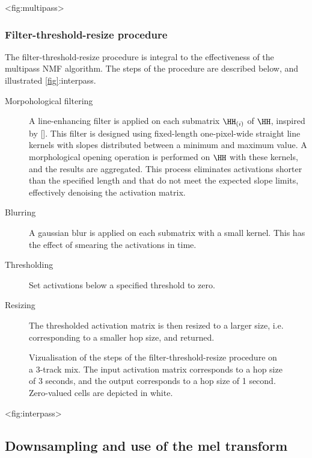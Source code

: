 \textless fig:multipass\textgreater{}

\subsubsection{Filter-threshold-resize procedure}

The filter-threshold-resize procedure is integral to the effectiveness
of the multipass NMF algorithm. The steps of the procedure are described
below, and illustrated \hyperref[fig]{{[}fig{]}}:interpass.

\begin{description}
\item[Morpohological filtering]
A line-enhancing filter is applied on each submatrix
\(\HH_{(i)}\) of \(\HH\), inspired by {[}{]}. This
filter is designed using fixed-length one-pixel-wide straight line
kernels with slopes distributed between a minimum and maximum value. A
morphological opening operation is performed on \(\HH\) with
these kernels, and the results are aggregated. This process eliminates
activations shorter than the specified length and that do not meet the
expected slope limits, effectively denoising the activation matrix.
\item[Blurring]
A gaussian blur is applied on each submatrix with a small kernel. This
has the effect of smearing the activations in time.
\item[Thresholding]
Set activations below a specified threshold to zero.
\item[Resizing]
The thresholded activation matrix is then resized to a larger size, i.e.
corresponding to a smaller hop size, and returned.
\end{description}

\begin{figure}
\centering

\caption{Vizualisation of the steps of the filter-threshold-resize
procedure on a 3-track mix. The input activation matrix corresponds to a
hop size of 3 seconds, and the output corresponds to a hop size of 1
second. Zero-valued cells are depicted in white.}
\end{figure}

\textless fig:interpass\textgreater{}

\subsection{Downsampling and use of the mel transform}

